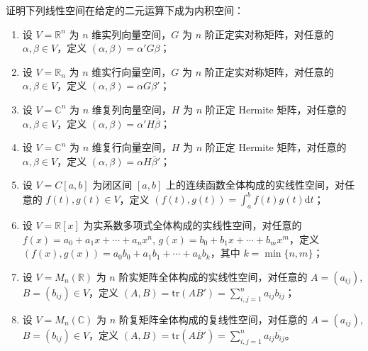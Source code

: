 \documentclass[../../main.tex]{subfiles}%
\begin{document}
\begin{example}[常见内积和内积空间]\label{example:常见内积和内积空间-例9.1}
    
证明下列线性空间在给定的二元运算下成为内积空间：
\begin{enumerate}[(1)]
\item 设 $V = \mathbb{R}^n$ 为 $n$ 维实列向量空间，$G$ 为 $n$ 阶正定实对称矩阵，对任意的 $\alpha, \beta \in V$，定义 $(\alpha, \beta) = \alpha'G\beta$；

\item 设 $V = \mathbb{R}_n$ 为 $n$ 维实行向量空间，$G$ 为 $n$ 阶正定实对称矩阵，对任意的 $\alpha, \beta \in V$，定义 $(\alpha, \beta) = \alpha G\beta'$；

\item 设 $V = \mathbb{C}^n$ 为 $n$ 维复列向量空间，$H$ 为 $n$ 阶正定 Hermite 矩阵，对任意的 $\alpha, \beta \in V$，定义 $(\alpha, \beta) = \alpha' H\overline{\beta}$；

\item 设 $V = \mathbb{C}^n$ 为 $n$ 维复行向量空间，$H$ 为 $n$ 阶正定 Hermite 矩阵，对任意的 $\alpha, \beta \in V$，定义 $(\alpha, \beta) = \alpha H\overline{\beta}'$；

\item 设 $V = C[a, b]$ 为闭区间 $[a, b]$ 上的连续函数全体构成的实线性空间，对任意的 $f(t), g(t) \in V$，定义 $(f(t), g(t)) = \int_{a}^{b} f(t)g(t) \mathrm{d}t$；

\item 设 $V = \mathbb{R}[x]$ 为实系数多项式全体构成的实线性空间，对任意的 $f(x) = a_0 + a_1x + \cdots + a_nx^n$, $g(x) = b_0 + b_1x + \cdots + b_mx^m$，定义 $(f(x), g(x)) = a_0b_0 + a_1b_1 + \cdots + a_kb_k$，其中 $k = \min\{n, m\}$；

\item\label{example:常见内积和内积空间-例9.1-7} 设 $V = M_n(\mathbb{R})$ 为 $n$ 阶实矩阵全体构成的实线性空间，对任意的 $A = (a_{ij})$, $B = (b_{ij}) \in V$，定义 $(A, B) = \mathrm{tr}(AB') = \sum_{i, j = 1}^{n} a_{ij}b_{ij}$；

\item 设 $V = M_n(\mathbb{C})$ 为 $n$ 阶复矩阵全体构成的复线性空间，对任意的 $A = (a_{ij})$, $B = (b_{ij}) \in V$，定义 $(A, B) = \mathrm{tr}(A\overline{B}') = \sum_{i, j = 1}^{n} a_{ij}\overline{b_{ij}}$。
\end{enumerate}
\end{example}
\end{document}
